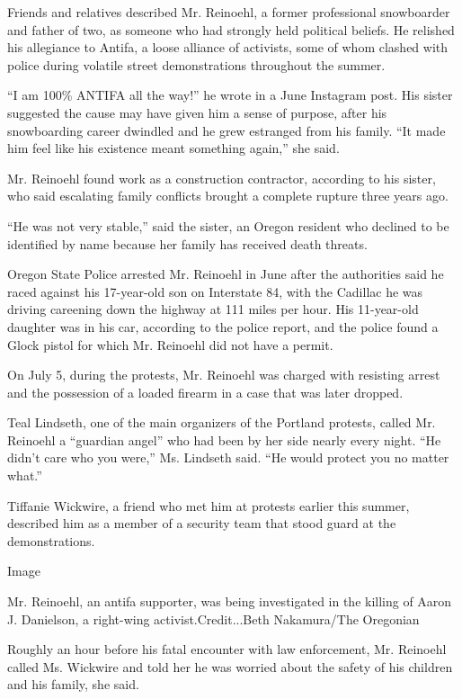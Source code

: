 Friends and relatives described Mr. Reinoehl, a former professional
snowboarder and father of two, as someone who had strongly held
political beliefs. He relished his allegiance to Antifa, a loose
alliance of activists, some of whom clashed with police during volatile
street demonstrations throughout the summer.

``I am 100\% ANTIFA all the way!'' he wrote in a June Instagram post.
His sister suggested the cause may have given him a sense of purpose,
after his snowboarding career dwindled and he grew estranged from his
family. ``It made him feel like his existence meant something again,''
she said.

Mr. Reinoehl found work as a construction contractor, according to his
sister, who said escalating family conflicts brought a complete rupture
three years ago.

``He was not very stable,'' said the sister, an Oregon resident who
declined to be identified by name because her family has received death
threats.

Oregon State Police arrested Mr. Reinoehl in June after the authorities
said he raced against his 17-year-old son on Interstate 84, with the
Cadillac he was driving careening down the highway at 111 miles per
hour. His 11-year-old daughter was in his car, according to the police
report, and the police found a Glock pistol for which Mr. Reinoehl did
not have a permit.

On July 5, during the protests, Mr. Reinoehl was charged with resisting
arrest and the possession of a loaded firearm in a case that was later
dropped.

Teal Lindseth, one of the main organizers of the Portland protests,
called Mr. Reinoehl a ``guardian angel'' who had been by her side nearly
every night. ``He didn't care who you were,'' Ms. Lindseth said. ``He
would protect you no matter what.''

Tiffanie Wickwire, a friend who met him at protests earlier this summer,
described him as a member of a security team that stood guard at the
demonstrations.

Image

Mr. Reinoehl, an antifa supporter, was being investigated in the killing
of Aaron J. Danielson, a right-wing activist.Credit...Beth Nakamura/The
Oregonian

Roughly an hour before his fatal encounter with law enforcement, Mr.
Reinoehl called Ms. Wickwire and told her he was worried about the
safety of his children and his family, she said.

